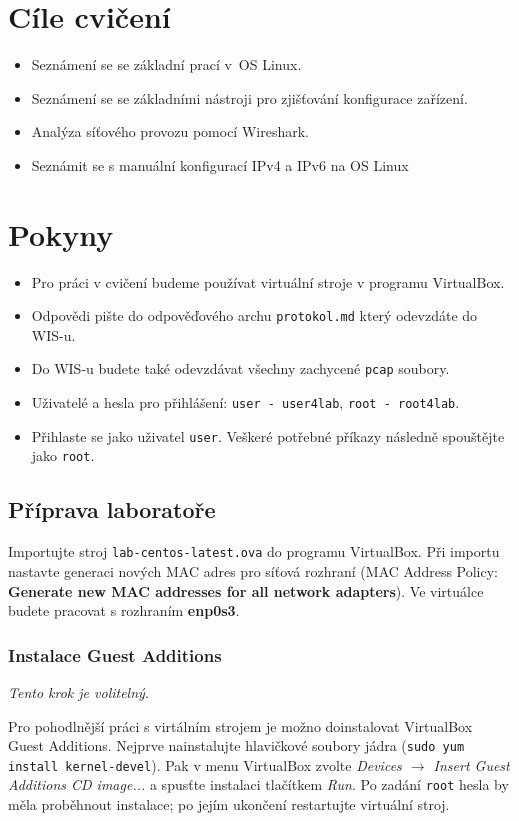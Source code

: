 \section*{Cíle cvičení}
\begin{itemize}
	\item Seznámení se se základní prací v~OS Linux.
	\item Seznámení se se základními nástroji pro zjišťování konfigurace zařízení.
	\item Analýza síťového provozu pomocí Wireshark.
	\item Seznámit se s manuální konfigurací IPv4 a IPv6 na OS Linux
\end{itemize}

\section*{Pokyny}
\begin{itemize}
\item Pro práci v cvičení budeme používat virtuální stroje v programu VirtualBox.
\item Odpovědi pište do odpověďového archu \texttt{protokol.md} který odevzdáte do WIS-u.
\item Do WIS-u budete také odevzdávat všechny zachycené \texttt{pcap} soubory.
\item Uživatelé a hesla pro přihlášení: \texttt{user - user4lab}, \texttt{root - root4lab}.
\item Přihlaste se jako uživatel \texttt{user}. Veškeré potřebné příkazy následně spouštějte jako \texttt{root}.
\end{itemize}

\subsection*{Příprava laboratoře}
Importujte stroj \texttt{lab-centos-latest.ova} do programu VirtualBox.
Při importu nastavte generaci nových MAC adres pro síťová rozhraní (MAC Address Policy: \textbf{Generate new MAC addresses for all network adapters}).
Ve virtuálce budete pracovat s rozhraním {\bf enp0s3}.

\subsubsection*{Instalace Guest Additions}
\textit{Tento krok je volitelný}.

Pro pohodlnější práci s virtálním strojem je možno doinstalovat VirtualBox Guest Additions.
Nejprve nainstalujte hlavičkové soubory jádra (\texttt{sudo yum install kernel-devel}).
Pak v menu VirtualBox zvolte \textit{Devices $\rightarrow$ Insert Guest Additions CD image...} a spusťte instalaci tlačítkem \textit{Run}.
Po zadání \texttt{root} hesla by měla proběhnout instalace; po jejím ukončení restartujte virtuální stroj.

